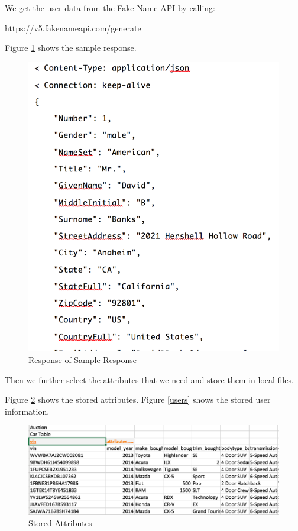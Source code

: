 \documentclass[12pt]{article}
\begin{document}
\par We get the user data from the Fake Name API by calling:
\par https://v5.fakenameapi.com/generate
\par Figure \ref{api_name} shows the sample response.
\begin{figure}[!h]
\caption{Response of Sample Response} \label{api_name}
\begin{center}
\includegraphics[width=13cm]{api_name}
\end{center}
\end{figure}
\par Then we further select the attributes that we need and store them in local files.
\par Figure \ref{attributes} shows the stored attributes. Figure \ref{users} shows the stored user information.
\begin{figure}[!h]
\caption{Stored Attributes} \label{attributes}
\begin{center}
\includegraphics[width=\textwidth]{attributes}
\end{center}
\end{figure}
\end{document}
